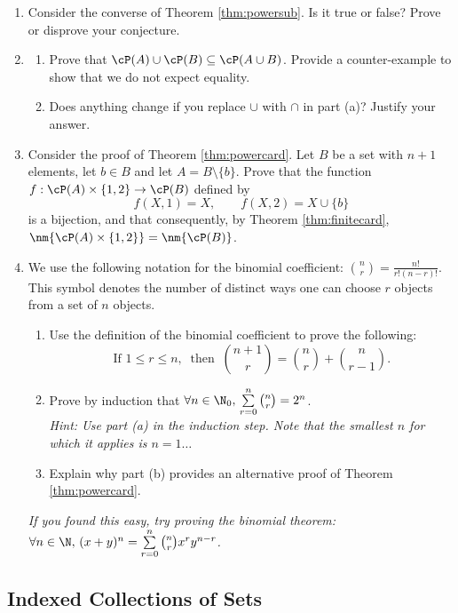 \begin{enumerate}
	\item\label{ex:powersub2} Consider the converse of Theorem \ref{thm:powersub}. Is it true or false? Prove or disprove your conjecture.
	
	\item\begin{enumerate}
	  \item Prove that $\cP(A)\cup\cP(B)\subseteq\cP(A\cup B)$. Provide a counter-example to show that we do not expect equality.
	  \item Does anything change if you replace $\cup$ with $\cap$ in part (a)? Justify your answer.
	\end{enumerate}
	
	\item Consider the proof of Theorem \ref{thm:powercard}. Let $B$ be a set with $n+1$ elements, let $b\in B$ and let $A=B\setminus\{b\}$. Prove that the function $f:\cP(A)\times\{1,2\}\to\cP(B)$ defined by
	\[f(X,1)=X,\qquad f(X,2)=X\cup\{b\}\]
	is a bijection, and that consequently, by Theorem \ref{thm:finitecard}, $\nm{\cP(A)\times\{1,2\}}=\nm{\cP(B)}$.
	
	\item\label{ex:binom} We use the following notation for the binomial coefficient: $\binom nr=\frac{n!}{r!(n-r)!}$. This symbol denotes the number of distinct ways one can choose $r$ objects from a set of $n$ objects.
	\begin{enumerate}
	  \item Use the definition of the binomial coefficient to prove the following:
	  \[\text{If } 1\le r\le n,\ \text{ then }\ \binom{n+1}r=\binom nr+\binom n{r-1}.\]
		\item Prove by induction that $\forall n\in\N_0,\,\sum\limits_{r=0}^n\binom nr=2^n$.\\
		\emph{Hint: Use part (a) in the induction step. Note that the smallest $n$ for which it applies is $n=1\ldots$}
		\item Explain why part (b) provides an alternative proof of Theorem \ref{thm:powercard}.
	\end{enumerate}
	\emph{If you found this easy, try proving the binomial theorem: $\forall n\in\N,\,(x+y)^n=\sum\limits_{r=0}^n\binom nrx^ry^{n-r}$.}
\end{enumerate}
\newpage

\subsection{Indexed Collections of Sets}

